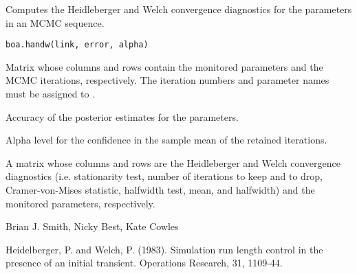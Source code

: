 \begin{Description}\relax
Computes the Heidleberger and Welch convergence diagnostics for the
parameters in an MCMC sequence.
\end{Description}
\begin{Usage}
\begin{verbatim}
boa.handw(link, error, alpha)
\end{verbatim}
\end{Usage}
\begin{Arguments}
\begin{ldescription}
\item[\code{link}] Matrix whose columns and rows contain the monitored parameters
and the MCMC iterations, respectively. The iteration numbers and parameter
names must be assigned to .
\item[\code{error}] Accuracy of the posterior estimates for the parameters.
\item[\code{alpha}] Alpha level for the confidence in the sample mean of the
retained iterations.
\end{ldescription}
\end{Arguments}
\begin{Value}
A matrix whose columns and rows are the Heidleberger and Welch convergence
diagnostics (i.e. stationarity test, number of iterations to keep and to drop,
Cramer-von-Mises statistic, halfwidth test, mean, and halfwidth) and the
monitored parameters, respectively.
\end{Value}
\begin{Author}\relax
Brian J. Smith, Nicky Best, Kate Cowles
\end{Author}
\begin{References}\relax
Heidelberger, P. and Welch, P. (1983). Simulation run length control
in the presence of an initial transient. Operations Research, 31, 1109-44.
\end{References}
\begin{SeeAlso}\relax
{}
\end{SeeAlso}

